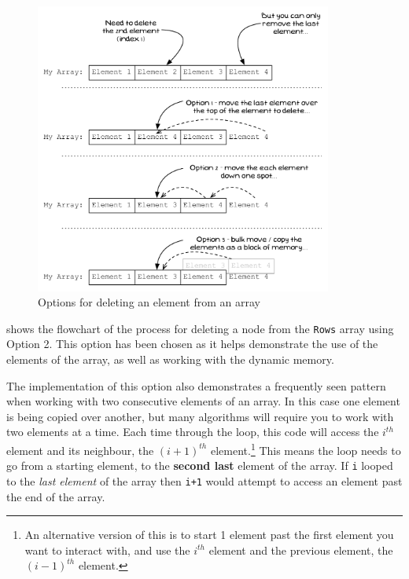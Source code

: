 \begin{figure}[h]
   \centering
   \includegraphics[width=0.87\textwidth]{./topics/dynamic-memory/diagrams/DeleteIllustration} 
   \caption{Options for deleting an element from an array}
   \label{fig:delete-illustration}
\end{figure}

 shows the flowchart of the process for deleting a node from the \texttt{Rows} array using Option 2. This option has been chosen as it helps demonstrate the use of the elements of the array, as well as working with the dynamic memory. 

The implementation of this option also demonstrates a frequently seen pattern when working with two consecutive elements of an array. In this case one element is being copied over another, but many algorithms will require you to work with two elements at a time. Each time through the loop, this code will access the $i^{th}$ element and its neighbour, the $(i+1)^{th}$ element.\footnote{An alternative version of this is to start 1 element past the first element you want to interact with, and use the $i^{th}$ element and the previous element, the $(i-1)^{th}$ element.} This means the loop needs to go from a starting element, to the \textbf{second last} element of the array. If \texttt{i} looped to the \emph{last element} of the array then \texttt{i+1} would attempt to access an element past the end of the array.

